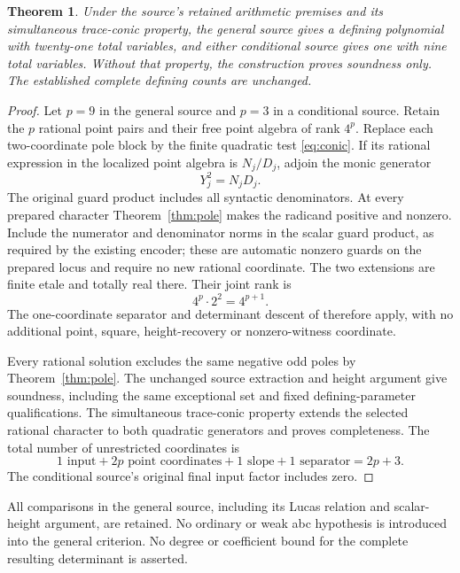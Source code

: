 \documentclass[11pt,a4paper]{article}
\newtheorem{theorem}{Theorem}[section]
\begin{document}
\begin{theorem}\label{thm:census}
Under the source's retained arithmetic premises and its simultaneous
trace-conic property, the general source gives a defining polynomial
with twenty-one total variables, and either conditional source gives
one with nine total variables. Without that property, the construction
proves soundness only. The established complete defining counts are
unchanged.
\end{theorem}
\begin{proof}
Let \(p=9\) in the general source and \(p=3\) in a conditional
source. Retain the \(p\) rational point pairs and their free point
algebra of rank \(4^p\). Replace each two-coordinate pole block
by the finite quadratic test \eqref{eq:conic}. If its rational
expression in the localized point algebra is \(N_j/D_j\), adjoin
the monic generator
\[
                              Y_j^2=N_jD_j.
\]
The original guard product includes all syntactic denominators.
At every prepared character Theorem~\ref{thm:pole} makes the radicand
positive and nonzero. Include the numerator and denominator norms in
the scalar guard product, as required by the existing encoder; these
are automatic nonzero guards on the prepared locus and require no
new rational coordinate. The two extensions are finite etale and
totally real there. Their joint rank is
\[
                          4^p\cdot2^2=4^{p+1}.
\]
The one-coordinate separator and determinant descent of \cite{Unit}
therefore apply, with no additional point, square, height-recovery or
nonzero-witness coordinate.

Every rational solution excludes the same negative odd poles by
Theorem~\ref{thm:pole}. The unchanged source extraction and height
argument give soundness, including the same exceptional set and fixed
defining-parameter qualifications. The simultaneous trace-conic
property extends the selected rational character to both quadratic
generators and proves completeness. The total number of unrestricted
coordinates is
\[
              1\text{ input}+2p\text{ point coordinates}
                +1\text{ slope}+1\text{ separator}=2p+3.
\]
The conditional source's original final input factor includes zero.
\end{proof}

All comparisons in the general source, including its Lucas relation
and scalar-height argument, are retained. No ordinary or weak abc
hypothesis is introduced into the general criterion. No degree or
coefficient bound for the complete resulting determinant is asserted.
\end{document}
